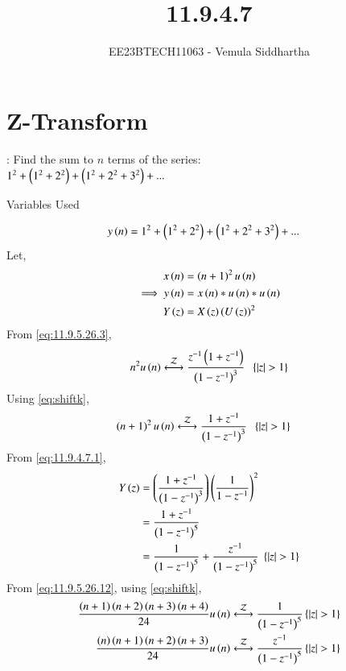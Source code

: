 \documentclass[journal,12pt,twocolumn]{IEEEtran}
\theoremstyle{remark}
\begin{document}

\vspace{3cm}

\title{11.9.4.7}
\author{EE23BTECH11063 - Vemula Siddhartha
}
\chapter{Z-Transform}
\maketitle
\newpage
\bigskip

\renewcommand{\thefigure}{\theenumi}
\renewcommand{\thetable}{\theenumi}
\question:
Find the sum to $n$ terms of the series:\\
    $1^2+\left(1^2+2^2\right)+\left(1^2+2^2+3^2\right)+...$
\solution
\fi
\begin{table}[h!]    
    \centering
    
    \caption{Variables Used}
    \label{tab10.5.3.9.1}
  \end{table}
\begin{align}
    y\left(n\right)&=1^2+\left(1^2+2^2\right)+\left(1^2+2^2+3^2\right)+...
\end{align}
Let,
\begin{align}
    x\left(n\right)&=\left(n+1\right)^2u\left(n\right)\\
    \implies y\left(n\right)&=x\left(n\right)*u\left(n\right)*u\left(n\right)\\
    Y\left(z\right)&=X\left(z\right)\left(U\left(z\right)\right)^2
\end{align}
From \eqref{eq:11.9.5.26.3},
\begin{align}
    n^2u\brak{n}\system{Z}\frac{z^{-1}\brak{1+z^{-1}}}{\brak{1-z^{-1}}^3}\;\;\cbrak{\abs{z}>1}
\end{align}
Using \eqref{eq:shiftk},
\begin{align}
    \brak{n+1}^2u\brak{n}&\system{Z}\frac{1+z^{-1}}{\brak{1-z^{-1}}^3}\;\;\cbrak{\abs{z}>1}\label{eq:11.9.4.7.1}
\end{align}
From \eqref{eq:11.9.4.7.1},
\begin{align}
    Y\left(z\right)&=\left(\frac{1+z^{-1}}{\left(1-z^{-1}\right)^3}\right)\left(\frac{1}{1-z^{-1}}\right)^2\\
    &=\frac{1+z^{-1}}{\left(1-z^{-1}\right)^5}\\
    &=\frac{1}{\left(1-z^{-1}\right)^5}+\frac{z^{-1}}{\left(1-z^{-1}\right)^5}\;\left\{\left\vert z\right\vert>1\right\}
\end{align}
From \eqref{eq:11.9.5.26.12}, using \eqref{eq:shiftk},
\begin{align}
    \frac{\brak{n+1}\brak{n+2}\brak{n+3}\brak{n+4}}{24}u\brak{n}&\system{Z}\frac{1}{\brak{1-z^{-1}}^5}\label{eq:11.9.4.7.2}\cbrak{\abs{z}>1}\\
    \frac{\brak{n}\brak{n+1}\brak{n+2}\brak{n+3}}{24}u\brak{n}&\system{Z}\frac{z^{-1}}{\brak{1-z^{-1}}^5}\label{eq:11.9.4.7.3}\cbrak{\abs{z}>1}
\end{align}
\end{document}
